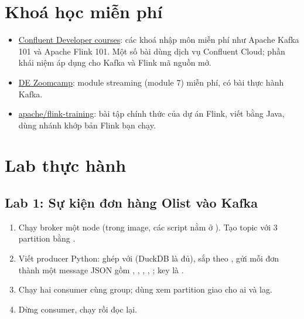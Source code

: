 \section{Khoá học miễn phí}
\begin{itemize}
  \item \href{https://developer.confluent.io/courses/}{Confluent Developer courses}: các khoá nhập môn miễn phí như Apache Kafka 101 và Apache Flink 101. Một số bài dùng dịch vụ Confluent Cloud; phần khái niệm áp dụng cho Kafka và Flink mã nguồn mở.
  \item \href{https://github.com/DataTalksClub/data-engineering-zoomcamp}{DE Zoomcamp}: module streaming (module 7) miễn phí, có bài thực hành Kafka.
  \item \href{https://github.com/apache/flink-training}{apache/flink-training}: bài tập chính thức của dự án Flink, viết bằng Java, dùng nhánh khớp bản Flink bạn chạy.
\end{itemize}

\section{Lab thực hành}

\subsection{Lab 1: Sự kiện đơn hàng Olist vào Kafka}
\begin{enumerate}
  \item Chạy broker  một node (trong image, các script nằm ở ). Tạo topic  với 3 partition bằng .
  \item Viết producer Python: ghép  với  (DuckDB là đủ), sắp theo , gửi mỗi đơn thành một message JSON gồm , , , , ; key là .
  \item Chạy hai consumer cùng group; dùng  xem partition giao cho ai và lag.
  \item Dừng consumer, chạy  rồi đọc lại.
\end{enumerate}

